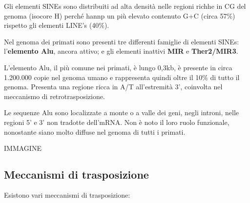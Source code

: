 \documentclass[]{article}
\begin{document}
Gli elementi SINEs sono distribuiti ad alta densità nelle regioni richhe
in CG del genoma (isocore H) perché hannp un più elevato contenuto G+C
(circa 57\%) rispetto gli elementi LINE's (40\%).

Nel genoma dei primati sono presenti tre differenti famiglie di elementi
SINEs: l'\textbf{elemento Alu}, ancora attivo; e gli elementi inattivi
\textbf{MIR} e \textbf{Ther2/MIR3}.

L'elemento Alu, il più comune nei primati, è lungo 0,3kb, è presente in
circa 1.200.000 copie nel genoma umano e rappresenta quindi oltre il
10\% di tutto il genoma. Presenta una regione ricca in A/T all'estremità
3', coinvolta nel meccanismo di retrotrasposizione.

Le sequenze Alu sono localizzate a monte o a valle dei geni, negli
introni, nelle regioni 5' e 3' non tradotte dell'mRNA. Non è noto il
loro ruolo funzionale, nonostante siano molto diffuse nel genoma di
tutti i primati.

IMMAGINE

\subsection{Meccanismi di
trasposizione}\label{meccanismi-di-trasposizione}

Esistono vari meccanismi di trasposizione:
\end{document}
